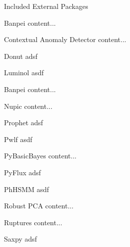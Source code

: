 \documentclass[10pt,a4paper]{report}
\begin{document}
	


\begin{chapter}{Included External Packages}
	
\begin{section}{Banpei}
	content...
\end{section}


\begin{section}{Contextual Anomaly Detector}
	content...
\end{section}
	
\begin{section}{Donut}
adsf	
\end{section}

\begin{section}{Luminol}
	asdf
\end{section}

\begin{section}{Banpei}
	content...
\end{section}


\begin{section}{Nupic}
	content...
\end{section}

\begin{section}{Prophet}
	adsf	
\end{section}

\begin{section}{Pwlf}
	asdf
\end{section}



\begin{section}{PyBasicBayes}
	content...
\end{section}

\begin{section}{PyFlux}
	adsf	
\end{section}

\begin{section}{PhHSMM}
	asdf
\end{section}

\begin{section}{Robust PCA}
	content...
\end{section}


\begin{section}{Ruptures}
	content...
\end{section}

\begin{section}{Saxpy}
	adsf	
\end{section}


\end{chapter}
\end{document}
